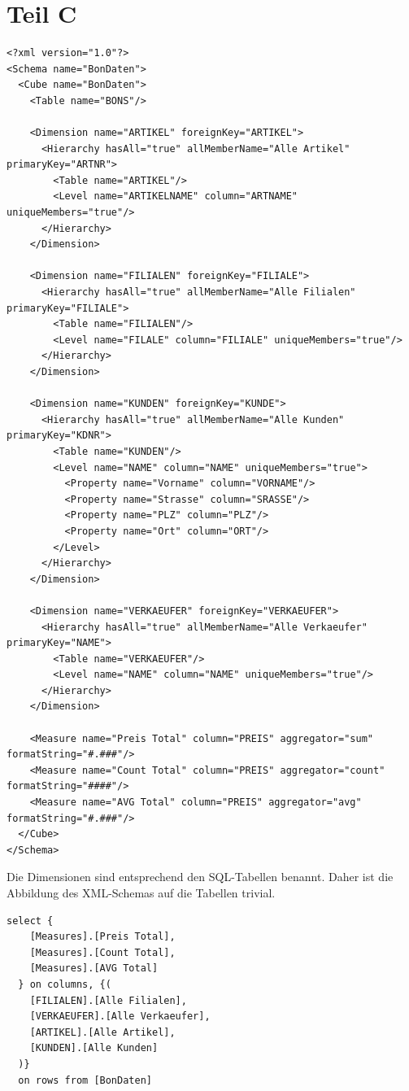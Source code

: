 \documentclass{scrreprt}
\begin{document}
\chapter{Teil C}

\begin{lstlisting}[caption={XML-Schema}]
<?xml version="1.0"?>
<Schema name="BonDaten">
  <Cube name="BonDaten">
    <Table name="BONS"/>
    
    <Dimension name="ARTIKEL" foreignKey="ARTIKEL">
      <Hierarchy hasAll="true" allMemberName="Alle Artikel" primaryKey="ARTNR">
        <Table name="ARTIKEL"/>
        <Level name="ARTIKELNAME" column="ARTNAME" uniqueMembers="true"/>
      </Hierarchy>
    </Dimension>
    
    <Dimension name="FILIALEN" foreignKey="FILIALE">
      <Hierarchy hasAll="true" allMemberName="Alle Filialen" primaryKey="FILIALE">
        <Table name="FILIALEN"/>
        <Level name="FILALE" column="FILIALE" uniqueMembers="true"/>
      </Hierarchy>
    </Dimension>
    
    <Dimension name="KUNDEN" foreignKey="KUNDE">
      <Hierarchy hasAll="true" allMemberName="Alle Kunden" primaryKey="KDNR">
        <Table name="KUNDEN"/>
        <Level name="NAME" column="NAME" uniqueMembers="true">
          <Property name="Vorname" column="VORNAME"/>
          <Property name="Strasse" column="SRASSE"/>
          <Property name="PLZ" column="PLZ"/>
          <Property name="Ort" column="ORT"/>
        </Level>
      </Hierarchy>
    </Dimension>
    
    <Dimension name="VERKAEUFER" foreignKey="VERKAEUFER">
      <Hierarchy hasAll="true" allMemberName="Alle Verkaeufer" primaryKey="NAME">
        <Table name="VERKAEUFER"/>
        <Level name="NAME" column="NAME" uniqueMembers="true"/>
      </Hierarchy>
    </Dimension>

    <Measure name="Preis Total" column="PREIS" aggregator="sum" formatString="#.###"/>
    <Measure name="Count Total" column="PREIS" aggregator="count" formatString="####"/>
    <Measure name="AVG Total" column="PREIS" aggregator="avg" formatString="#.###"/>
  </Cube>
</Schema>
\end{lstlisting}

Die Dimensionen sind entsprechend den SQL-Tabellen benannt.
Daher ist die Abbildung des XML-Schemas auf die Tabellen trivial.

\begin{lstlisting}[caption={Query 1}]
  select {
    [Measures].[Preis Total],
    [Measures].[Count Total],
    [Measures].[AVG Total]
  } on columns, {(
    [FILIALEN].[Alle Filialen],
    [VERKAEUFER].[Alle Verkaeufer],
    [ARTIKEL].[Alle Artikel],
    [KUNDEN].[Alle Kunden]
  )}
  on rows from [BonDaten]
\end{lstlisting}
\end{document}
